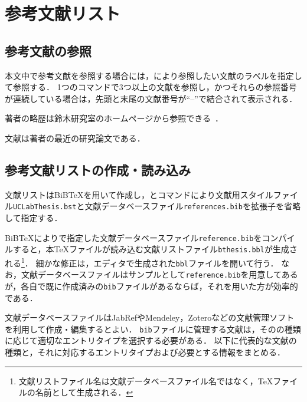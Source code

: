 \documentclass[a4j,11pt]{ujreport}
\begin{document}
\section{参考文献リスト}
\label{sec:reference}

\subsection{参考文献の参照}
本文中で参考文献を参照する場合には，により参照したい文献のラベルを指定して参照する．
1つのコマンドで3つ以上の文献を参照し，かつそれらの参照番号が連続している場合は，先頭と末尾の文献番号が``--''で結合されて表示される．

\begin{screen}
著者の略歴は鈴木研究室のホームページから参照できる~\cite{UCLab}．

文献\cite{GSRA,MPPC-HP,NTMobile}は著者の最近の研究論文である．
\end{screen}

\subsection{参考文献リストの作成・読み込み}
\label{subsec:ReferenceInfo}
文献リストはBiB{\TeX}を用いて作成し，とコマンドにより文献用スタイルファイル\texttt{UCLabThesis.bst}と文献データベースファイル\texttt{references.bib}を拡張子を省略して指定する．

\begin{code}
\end{code}

BiB{\TeX}によりで指定した文献データベースファイル\texttt{reference.bib}をコンパイルすると，本{\TeX}ファイルが読み込む文献リストファイル\texttt{bthesis.bbl}が生成される\footnote{文献リストファイル名は文献データベースファイル名ではなく，{\TeX}ファイルの名前として生成される．}．
細かな修正は，エディタで生成された\texttt{bbl}ファイルを開いて行う．
なお，文献データベースファイルはサンプルとして\texttt{reference.bib}を用意してあるが，各自で既に作成済みの\texttt{bib}ファイルがあるならば，それを用いた方が効率的である．

文献データベースファイルはJabRef\cite{JabRef}やMendeley\cite{Mendeley}，Zoteroなどの文献管理ソフトを利用して作成・編集するとよい．
\texttt{bib}ファイルに管理する文献は，そのの種類に応じて適切なエントリタイプを選択する必要がある．
以下に代表的な文献の種類と，それに対応するエントリタイプおよび必要とする情報をまとめる．
\end{document}
